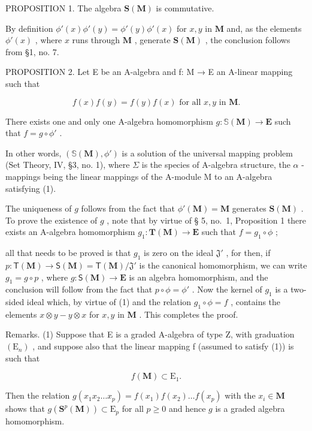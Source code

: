 PROPOSITION 1. The algebra \(\mathbf{S}(\mathbf{M})\) is commutative.

By definition \(\phi'(x)\phi'(y) = \phi'(y)\phi'(x)\) for \(x, y\) in \(\mathbf{M}\) and, as the elements \(\phi'(x)\) , where \(x\) runs through \(\mathbf{M}\) , generate \(\mathbf{S}(\mathbf{M})\) , the conclusion follows from §1, no. 7.

PROPOSITION 2. Let E be an A-algebra and f: M → E an A-linear mapping such that

\[
f (x) f (y) = f (y) f (x) \text {   for   all   } x, y \text {   in   } \mathbf {M}.\tag{1}
\]

There exists one and only one A-algebra homomorphism \(g \colon \mathbb{S}(\mathbf{M}) \to \mathbf{E}\) such that \(f = g \circ \phi'\) .

In other words, \((\mathbb{S}(\mathbf{M}), \phi')\) is a solution of the universal mapping problem (Set Theory, IV, §3, no. 1), where \(\Sigma\) is the species of A-algebra structure, the \(\alpha\) -mappings being the linear mappings of the A-module M to an A-algebra satisfying (1).

The uniqueness of \(g\) follows from the fact that \(\phi'(\mathbf{M}) = \mathbf{M}\) generates \(\mathbf{S}(\mathbf{M})\) . To prove the existence of \(g\) , note that by virtue of § 5, no.~1, Proposition 1 there exists an A-algebra homomorphism \(g_1: \mathbf{T}(\mathbf{M}) \to \mathbf{E}\) such that \(f = g_1 \circ \phi\) ;

all that needs to be proved is that \(g_1\) is zero on the ideal \(\mathfrak{J}'\) , for then, if \(p: \mathsf{T}(\mathbf{M}) \to \mathsf{S}(\mathbf{M}) = \mathsf{T}(\mathbf{M}) / \mathfrak{J}'\) is the canonical homomorphism, we can write \(g_1 = g \circ p\) , where \(g: \mathsf{S}(\mathbf{M}) \to \mathbf{E}\) is an algebra homomorphism, and the conclusion will follow from the fact that \(p \circ \phi = \phi'\) . Now the kernel of \(g_1\) is a two-sided ideal which, by virtue of (1) and the relation \(g_1 \circ \phi = f\) , contains the elements \(x \otimes y - y \otimes x\) for \(x, y\) in \(\mathbf{M}\) . This completes the proof.

Remarks. (1) Suppose that E is a graded A-algebra of type Z, with graduation \((\mathrm{E}_{n})\) , and suppose also that the linear mapping f (assumed to satisfy (1)) is such that

\[
f (\mathbf {M}) \subset \mathrm{E} _ {1}.\tag{2}
\]

Then the relation \(g(x_1x_2 \ldots x_p) = f(x_1)f(x_2) \ldots f(x_p)\) with the \(x_i \in \mathbf{M}\) shows that \(g(\mathbf{S}^p(\mathbf{M})) \subset \mathrm{E}_p\) for all \(p \geqslant 0\) and hence \(g\) is a graded algebra homomorphism.


